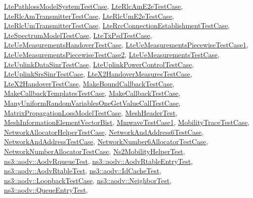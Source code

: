 \hyperlink{classLtePathlossModelSystemTestCase}{Lte\+Pathloss\+Model\+System\+Test\+Case}, \hyperlink{classLteRlcAmE2eTestCase}{Lte\+Rlc\+Am\+E2e\+Test\+Case}, \hyperlink{classLteRlcAmTransmitterTestCase}{Lte\+Rlc\+Am\+Transmitter\+Test\+Case}, \hyperlink{classLteRlcUmE2eTestCase}{Lte\+Rlc\+Um\+E2e\+Test\+Case}, \hyperlink{classLteRlcUmTransmitterTestCase}{Lte\+Rlc\+Um\+Transmitter\+Test\+Case}, \hyperlink{classLteRrcConnectionEstablishmentTestCase}{Lte\+Rrc\+Connection\+Establishment\+Test\+Case}, \hyperlink{classLteSpectrumModelTestCase}{Lte\+Spectrum\+Model\+Test\+Case}, \hyperlink{classLteTxPsdTestCase}{Lte\+Tx\+Psd\+Test\+Case}, \hyperlink{classLteUeMeasurementsHandoverTestCase}{Lte\+Ue\+Measurements\+Handover\+Test\+Case}, \hyperlink{classLteUeMeasurementsPiecewiseTestCase1}{Lte\+Ue\+Measurements\+Piecewise\+Test\+Case1}, \hyperlink{classLteUeMeasurementsPiecewiseTestCase2}{Lte\+Ue\+Measurements\+Piecewise\+Test\+Case2}, \hyperlink{classLteUeMeasurementsTestCase}{Lte\+Ue\+Measurements\+Test\+Case}, \hyperlink{classLteUplinkDataSinrTestCase}{Lte\+Uplink\+Data\+Sinr\+Test\+Case}, \hyperlink{classLteUplinkPowerControlTestCase}{Lte\+Uplink\+Power\+Control\+Test\+Case}, \hyperlink{classLteUplinkSrsSinrTestCase}{Lte\+Uplink\+Srs\+Sinr\+Test\+Case}, \hyperlink{classLteX2HandoverMeasuresTestCase}{Lte\+X2\+Handover\+Measures\+Test\+Case}, \hyperlink{classLteX2HandoverTestCase}{Lte\+X2\+Handover\+Test\+Case}, \hyperlink{classMakeBoundCallbackTestCase}{Make\+Bound\+Callback\+Test\+Case}, \hyperlink{classMakeCallbackTemplatesTestCase}{Make\+Callback\+Templates\+Test\+Case}, \hyperlink{classMakeCallbackTestCase}{Make\+Callback\+Test\+Case}, \hyperlink{classManyUniformRandomVariablesOneGetValueCallTestCase}{Many\+Uniform\+Random\+Variables\+One\+Get\+Value\+Call\+Test\+Case}, \hyperlink{classMatrixPropagationLossModelTestCase}{Matrix\+Propagation\+Loss\+Model\+Test\+Case}, \hyperlink{structMeshHeaderTest}{Mesh\+Header\+Test}, \hyperlink{structMeshInformationElementVectorBist}{Mesh\+Information\+Element\+Vector\+Bist}, \hyperlink{classMmwaveTestCase1}{Mmwave\+Test\+Case1}, \hyperlink{classMobilityTraceTestCase}{Mobility\+Trace\+Test\+Case}, \hyperlink{classNetworkAllocatorHelperTestCase}{Network\+Allocator\+Helper\+Test\+Case}, \hyperlink{classNetworkAndAddress6TestCase}{Network\+And\+Address6\+Test\+Case}, \hyperlink{classNetworkAndAddressTestCase}{Network\+And\+Address\+Test\+Case}, \hyperlink{classNetworkNumber6AllocatorTestCase}{Network\+Number6\+Allocator\+Test\+Case}, \hyperlink{classNetworkNumberAllocatorTestCase}{Network\+Number\+Allocator\+Test\+Case}, \hyperlink{classNs2MobilityHelperTest}{Ns2\+Mobility\+Helper\+Test}, \hyperlink{structns3_1_1aodv_1_1AodvRqueueTest}{ns3\+::aodv\+::\+Aodv\+Rqueue\+Test}, \hyperlink{structns3_1_1aodv_1_1AodvRtableEntryTest}{ns3\+::aodv\+::\+Aodv\+Rtable\+Entry\+Test}, \hyperlink{structns3_1_1aodv_1_1AodvRtableTest}{ns3\+::aodv\+::\+Aodv\+Rtable\+Test}, \hyperlink{classns3_1_1aodv_1_1IdCacheTest}{ns3\+::aodv\+::\+Id\+Cache\+Test}, \hyperlink{classns3_1_1aodv_1_1LoopbackTestCase}{ns3\+::aodv\+::\+Loopback\+Test\+Case}, \hyperlink{structns3_1_1aodv_1_1NeighborTest}{ns3\+::aodv\+::\+Neighbor\+Test}, \hyperlink{structns3_1_1aodv_1_1QueueEntryTest}{ns3\+::aodv\+::\+Queue\+Entry\+Test}, 